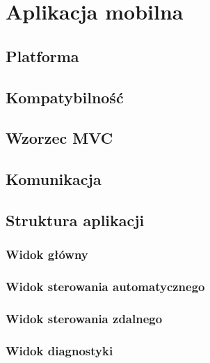 \chapter{Aplikacja mobilna}
\section{Platforma}
\section{Kompatybilność}
\section{Wzorzec MVC}
\section{Komunikacja}

\section{Struktura aplikacji}
\subsection{Widok główny}
\subsection{Widok sterowania automatycznego}
\subsection{Widok sterowania zdalnego}
\subsection{Widok diagnostyki}